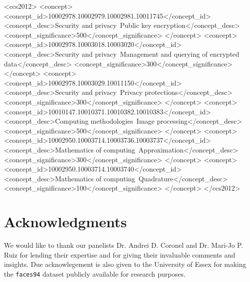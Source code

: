 \documentclass{sig-alternate-05-2015}
\begin{document}
%
%
\begin{CCSXML}
  <ccs2012>
  <concept>
  <concept_id>10002978.10002979.10002981.10011745</concept_id>
  <concept_desc>Security and privacy~Public key encryption</concept_desc>
  <concept_significance>500</concept_significance>
  </concept>
  <concept>
  <concept_id>10002978.10003018.10003020</concept_id>
  <concept_desc>Security and privacy~Management and querying of encrypted data</concept_desc>
  <concept_significance>300</concept_significance>
  </concept>
  <concept>
  <concept_id>10002978.10003029.10011150</concept_id>
  <concept_desc>Security and privacy~Privacy protections</concept_desc>
  <concept_significance>300</concept_significance>
  </concept>
  <concept>
  <concept_id>10010147.10010371.10010382.10010383</concept_id>
  <concept_desc>Computing methodologies~Image processing</concept_desc>
  <concept_significance>500</concept_significance>
  </concept>
  <concept>
  <concept_id>10002950.10003714.10003736.10003737</concept_id>
  <concept_desc>Mathematics of computing~Approximation</concept_desc>
  <concept_significance>300</concept_significance>
  </concept>
  <concept>
  <concept_id>10002950.10003714.10003740</concept_id>
  <concept_desc>Mathematics of computing~Quadrature</concept_desc>
  <concept_significance>100</concept_significance>
  </concept>
  </ccs2012>
\end{CCSXML}


\printccsdesc
{}




\section{Acknowledgments}
We would like to thank our panelists Dr. Andrei D. Coronel and Dr. Mari-Jo P. Ruiz for lending their expertise and for giving their invaluable comments and insights.
Due acknowlegement is also given to the University of Essex for making the \texttt{faces94} dataset publicly available for research purposes.


% 

\balancecolumns

\appendix

\balancecolumns
\end{document}
